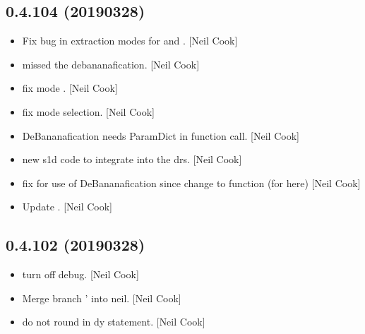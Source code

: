\documentclass[a4paper,10pt,english]{report}
\begin{document}
\subsection{0.4.104 (2019\sphinxhyphen{}03\sphinxhyphen{}28)}
\label{\detokenize{misc/changelog:id174}}\begin{itemize}
\item {} 
Fix bug in extraction modes for  and
. {[}Neil Cook{]}

\item {} 
 \sphinxhyphen{} missed the debananafication. {[}Neil Cook{]}

\item {} 
 \sphinxhyphen{} fix mode . {[}Neil Cook{]}

\item {} 
 \sphinxhyphen{} fix mode selection. {[}Neil Cook{]}

\item {} 
 \sphinxhyphen{} DeBananafication needs ParamDict in function call.
{[}Neil Cook{]}

\item {} 
 \sphinxhyphen{} new s1d code to integrate into the drs.
{[}Neil Cook{]}

\item {} 
 \sphinxhyphen{} fix for use of DeBananafication since change to
function (for  here) {[}Neil Cook{]}

\item {} 
Update . {[}Neil Cook{]}

\end{itemize}


\subsection{0.4.102 (2019\sphinxhyphen{}03\sphinxhyphen{}28)}
\label{\detokenize{misc/changelog:id175}}\begin{itemize}
\item {} 
 \sphinxhyphen{} turn off  debug. {[}Neil Cook{]}

\item {} 
Merge branch ’ into neil. {[}Neil Cook{]}

\item {} 
 \sphinxhyphen{} do not round in dy statement. {[}Neil Cook{]}

\end{itemize}
\end{document}

